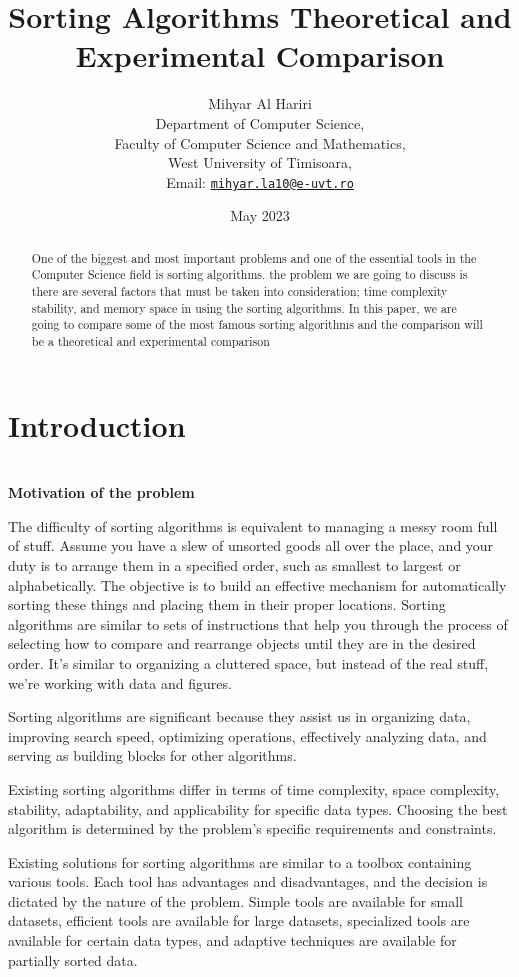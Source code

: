 \documentclass{article}
\title{Sorting Algorithms Theoretical and Experimental Comparison}
\author{Mihyar Al Hariri\\
Department of Computer Science,\\
Faculty of Computer Science and Mathematics, \\
West University of Timisoara, \\
Email: \href{mailto:mihyar.la10@e-uvt.ro}{\texttt{mihyar.la10@e-uvt.ro}}
}
\date{May 2023}
\begin{document}
\maketitle

\begin{abstract}
One of the biggest and most important problems and one of the essential tools in the Computer Science field is sorting algorithms.
the problem we are going to discuss is there are several factors that must be taken into consideration; time complexity 
stability, and memory space in using the sorting algorithms.
In this paper, we are going to compare some of the most famous sorting algorithms and the comparison will be a theoretical and experimental comparison
\end{abstract}
\newpage
\tableofcontents
\newpage
\section{Introduction}
\\
\textbf{\large Motivation of the problem}

The difficulty of sorting algorithms is equivalent to managing a messy room full of stuff. Assume you have a slew of unsorted goods all over the place, and your duty is to arrange them in a specified order, such as smallest to largest or alphabetically. The objective is to build an effective mechanism for automatically sorting these things and placing them in their proper locations. Sorting algorithms are similar to sets of instructions that help you through the process of selecting how to compare and rearrange objects until they are in the desired order. It's similar to organizing a cluttered space, but instead of the real stuff, we're working with data and figures.

Sorting algorithms are significant because they assist us in organizing data, improving search speed, optimizing operations, effectively analyzing data, and serving as building blocks for other algorithms.

Existing sorting algorithms differ in terms of time complexity, space complexity, stability, adaptability, and applicability for specific data types. Choosing the best algorithm is determined by the problem's specific requirements and constraints.

Existing solutions for sorting algorithms are similar to a toolbox containing various tools. Each tool has advantages and disadvantages, and the decision is dictated by the nature of the problem. Simple tools are available for small datasets, efficient tools are available for large datasets, specialized tools are available for certain data types, and adaptive techniques are available for partially sorted data.
\end{document}
